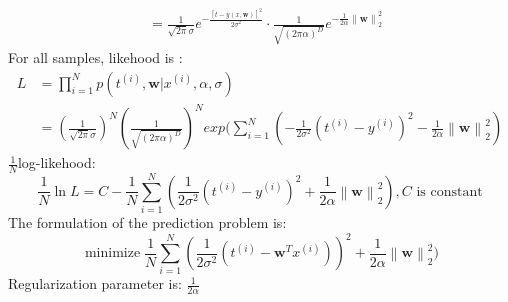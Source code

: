 \documentclass{article}
\newcommand{\norm}[2]{\left\| #1 \right\|_{#2}}
\DeclareMathOperator*{\minimize}{minimize}
\begin{document}
\begin{enumerate}[(1)]
\begin{equation}
\begin{aligned}
	&=\frac{1}{\sqrt{2\pi}\sigma}e^{-\frac{[t-y(x,\textbf{w})]^2}{2\sigma^2}}\cdot \frac{1}{\sqrt{(2\pi\alpha)^D}}e^{-\frac{1}{2\alpha}\norm{\bm{w}}2^2}
	\end{aligned}
	\end{equation}
	For all samples, likehood is :\\
	\begin{equation}
		\begin{aligned}
		L &= {\displaystyle \prod_{i=1}^{N}} p(t^{(i)},\bm{w}|x^{(i)},\alpha,\sigma)\\
		&=(\frac{1}{\sqrt{2\pi}\sigma})^N(\frac{1}{\sqrt{(2\pi\alpha)^D}})^N exp({\displaystyle \sum_{i=1}^{N}}(-\frac{1}{2\sigma^2}(t^{(i)}-y^{(i)})^2 - \frac{1}{2\alpha}\norm{\bm{w}}2^2)
		\end{aligned}
	\end{equation}
	$\frac{1}{N}$log-likehood: \\
	$$\frac{1}{N}\ln{L} = C - \frac{1}{N}{\displaystyle \sum_{i=1}^{N}}(\frac{1}{2\sigma^2}(t^{(i)}-y^{(i)})^2 + \frac{1}{2\alpha}\norm{\bm{w}}2^2), C \text{ is constant}$$
	The formulation of the prediction problem is:\\
	$$\displaystyle{\minimize\frac{1}{N}{\displaystyle \sum_{i=1}^{N}}(\frac{1}{2\sigma^2}(t^{(i)}-\bm{w}^Tx^{(i)}))^2 + \frac{1}{2\alpha}\norm{\bm{w}}2^2)}$$
	Regularization parameter is: $\frac{1}{2\alpha}$
\end{enumerate}
\end{document}
